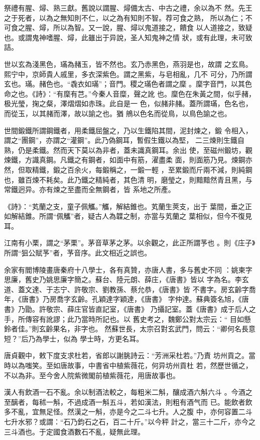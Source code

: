 \documentclass{ctexart}
\begin{document}
祭禮有腥、燖、熟三獻。舊說以謂腥、燖備太古、中古之禮，余以為不 然。先王之于死者，以為之無知則不仁，以之為有知則不智。荐可食之熟， 所以為仁；不可食之腥、燖，所以為智。又一說，腥、燖以鬼道接之，饋食 以人道接之，致疑也。或謂鬼神嗜腥、燖，此雖出于异說，圣人知鬼神之情 狀，或有此理，未可致詰。

世以玄為淺黑色，璊為赭玉，皆不然也。玄乃赤黑色，燕羽是也，故謂 之玄鳥。熙宁中，京師貴人戚里，多衣深紫色。謂之黑紫，与皂相亂，几不 可分，乃所謂玄也。璊。赭色也。``毳衣如璊''；音門。稷之璊色者謂之穈 。穈字音門，以其色命之也。《詩》：``有穈有芑。''今秦人音糜，聲之訛 也。穈色在朱黃之間，似乎赭，极光瑩，掬之粲，澤熠熠如赤珠。此自是一 色，似赭非赭。蓋所謂璊，色名也，而從玉，以其赭而澤，故以諭之也。猶 鴘以色名而從鳥，以鳥色諭之也。

世間鍛鐵所謂鋼鐵者，用柔鐵屈盤之，乃以生鐵陷其間，泥封煉之，鍛 令相入，謂之``團鋼''，亦謂之``灌鋼''。此乃偽鋼耳，暫假生鐵以為堅， 二三煉則生鐵自熟，仍是柔鐵。然而天下莫以為非者，蓋未識真鋼耳。余出 使，至磁州鍛坊，觀煉鐵，方識真鋼。凡鐵之有鋼者，如面中有筋，濯盡柔 面，則面筋乃見。煉鋼亦然，但取精鐵，鍛之百余火，每鍛稱之，一鍛一輕 ，至累鍛而斤兩不減，則純鋼也，雖百煉不耗矣。此乃鐵之精純者，其色清 明，磨瑩之，則黯黯然青且黑，与常鐵迥异。亦有煉之至盡而全無鋼者，皆 系地之所產。

《詩》：``芄蘭之支，童子佩觿。''觿，解結錐也。芄蘭生莢支，出于 葉間，垂之正如解結錐。所謂``佩觿''者，疑古人為韘之制，亦當与芄蘭之 葉相似，但今不復見耳。

江南有小栗，謂之``茅栗''。茅音草茅之茅。以余觀之，此正所謂芧也 。則《庄子》所謂``狙公賦芧''者，芧音序。此文相近之誤也。

余家有閻博陵畫唐秦府十八學士，各有真贊，亦唐人書，多与舊史不同 ：姚柬字思廉，舊史乃姚思廉字簡之。蘇台、陸元朗、薛庄，《唐書》皆以 字為名。李玄道、蓋文達、于志宁、許敬宗、劉教孫、蔡允恭，《唐書》皆 不書字。房玄齡字喬年，《唐書》乃房喬字玄齡。孔穎達字穎達，《唐書》 字仲達。蘇典簽名旭，《唐書》乃勖。許敬宗、薛庄官皆直記室，《唐書》 乃攝記室。蓋《唐書》成于后人之手，所傳容有訛謬；此乃當時所記也。以 舊史考之，魏鄭公對太宗云：`` 目如懸鈴者佳。''則玄齡果名，非字也。 然蘇世長，太宗召對玄武門，問云：``卿何名長意短？''后乃為學士，似為 學士時，方更名耳。

唐貞觀中，敕下度支求杜若，省郎以謝朓詩云：``芳洲采杜若。''乃責 坊州貢之。當時以為嗤笑。至如唐故事，中書省中植紫薇花，何异坊州貢杜 若，然歷世循之，不以為非。至今舍人院紫微閣前植紫薇花，用唐故事也。

漢人有飲酒一石不亂。余以制酒法較之，每粗米二斛，釀成酒六斛六斗 。今酒之至醨者，每秫一斛，不過成酒一斛五斗，若如漢法，則粗有酒气而 已。能飲者飲多不亂，宜無足怪。然漢之一斛，亦是今之二斗七升。人之腹 中，亦何容置二斗七升水邪？或謂：``石乃鈞石之石，百二十斤。''以今秤 計之，當三十二斤，亦今之三斗酒也。于定國食酒數石不亂，疑無此理。
\end{document}

